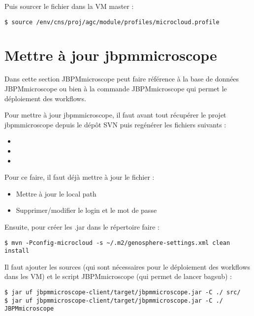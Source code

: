 Puis sourcer le fichier  dans la VM master :
\begin{lstlisting}[style=bash]
$ source /env/cns/proj/agc/module/profiles/microcloud.profile
\end{lstlisting}

\section{Mettre à jour jbpmmicroscope}

Dans cette section JBPMmicroscope peut faire référence à la base de données JBPMmicroscope ou bien à la commande JBPMmicroscope qui permet le déploiement des workflows.
\newline

Pour mettre à jour jbpmmicroscope, il faut avant tout récupérer le projet jbpmmicroscope depuis le dépôt SVN puis regénérer les fichiers suivants :
\begin{itemize}
    \item {}
    \item {}
    \item {}
\end{itemize}
\bigskip

Pour ce faire, il faut déjà mettre à jour le fichier  :
\begin{itemize}
    \item Mettre à jour le local path
    \item Supprimer/modifier le login et le mot de passe
\end{itemize}
\bigskip

Ensuite, pour créer les .jar dans le répertoire  faire :

\begin{lstlisting}[style=bash]
$ mvn -Pconfig-microcloud -s ~/.m2/genosphere-settings.xml clean install
\end{lstlisting}
\bigskip

Il faut ajouter les sources (qui sont nécessaires pour le déploiement des workflows dans les VM) et le script JBPMmicroscope (qui permet de lancer bagsub) :
\begin{lstlisting}[style=bash]
$ jar uf jbpmmicroscope-client/target/jbpmmicroscope.jar -C ./ src/
$ jar uf jbpmmicroscope-client/target/jbpmmicroscope.jar -C ./ JBPMmicroscope
\end{lstlisting}
\bigskip

